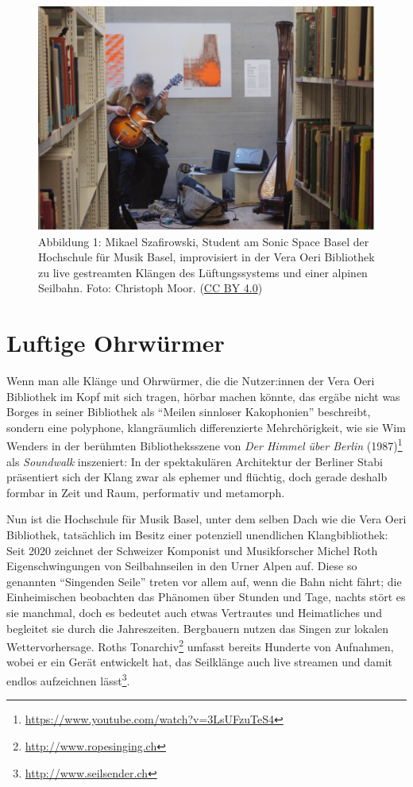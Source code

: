 \documentclass[a4paper,
fontsize=11pt,
oneside,
numbers=noperiodatend,
parskip=half-,
bibliography=totoc,
final
]{scrartcl}
\begin{document}
\begin{figure}
\centering
\includegraphics{img/Abb1.jpg}
\caption{Abbildung 1: Mikael Szafirowski, Student am Sonic Space Basel
der Hochschule für Musik Basel, improvisiert in der Vera Oeri Bibliothek
zu live gestreamten Klängen des Lüftungssystems und einer alpinen
Seilbahn. Foto: Christoph Moor. (\href{https://creativecommons.org/licenses/by/4.0/}{CC BY 4.0})}
\end{figure}

\hypertarget{luftige-ohrwuxfcrmer}{%
\section{Luftige Ohrwürmer}\label{luftige-ohrwuxfcrmer}}

Wenn man alle Klänge und Ohrwürmer, die die Nutzer:innen der Vera Oeri
Bibliothek im Kopf mit sich tragen, hörbar machen könnte, das ergäbe
nicht was Borges in seiner Bibliothek als \enquote{Meilen sinnloser
Kakophonien} beschreibt, sondern eine polyphone, klangräumlich
differenzierte Mehrchörigkeit, wie sie Wim Wenders in der berühmten
Bibliotheksszene von \emph{Der Himmel über Berlin} (1987)\footnote{\url{https://www.youtube.com/watch?v=3LsUFzuTeS4}}
als \emph{Soundwalk} inszeniert: In der spektakulären Architektur der
Berliner Stabi präsentiert sich der Klang zwar als ephemer und flüchtig,
doch gerade deshalb formbar in Zeit und Raum, performativ und metamorph.

Nun ist die Hochschule für Musik Basel, unter dem selben Dach wie die
Vera Oeri Bibliothek, tatsächlich im Besitz einer potenziell unendlichen
Klangbibliothek: Seit 2020 zeichnet der Schweizer Komponist und
Musikforscher Michel Roth Eigenschwingungen von Seilbahnseilen in den
Urner Alpen auf. Diese so genannten \enquote{Singenden Seile} treten vor
allem auf, wenn die Bahn nicht fährt; die Einheimischen beobachten das
Phänomen über Stunden und Tage, nachts stört es sie manchmal, doch es
bedeutet auch etwas Vertrautes und Heimatliches und begleitet sie durch
die Jahreszeiten. Bergbauern nutzen das Singen zur lokalen
Wettervorhersage. Roths Tonarchiv\footnote{\url{http://www.ropesinging.ch}}
umfasst bereits Hunderte von Aufnahmen, wobei er ein Gerät entwickelt
hat, das Seilklänge auch live streamen und damit endlos aufzeichnen
lässt\footnote{\url{http://www.seilsender.ch}}.
\end{document}
